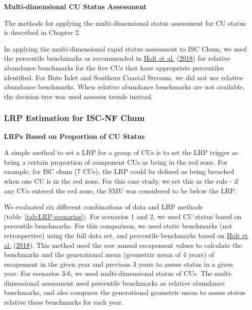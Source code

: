 \documentclass[11pt]{book}
\begin{document}
\textbf{Multi-dimensional CU Status Assessment}

The methods for applying the multi-dimensional status assessment for CU status is described in Chapter 2.

In applying the multi-dimensional rapid status assessment to ISC Chum, we used the percentile benchmarks as recommended in \protect\hyperlink{ref-holtEvaluatingBenchmarksBiological2018}{Holt et al.} (\protect\hyperlink{ref-holtEvaluatingBenchmarksBiological2018}{2018}) for relative abundance benchmarks for the five CUs that have appropriate percentiles identified. For Bute Inlet and Southern Coastal Streams, we did not use relative abundance benchmarks. When relative abundance benchmarks are not available, the decision tree was used assesses trends instead.

\hypertarget{lrp-estimation-for-isc-nf-chum}{%
\subsubsection{LRP Estimation for ISC-NF Chum}\label{lrp-estimation-for-isc-nf-chum}}

\textbf{LRPs Based on Proportion of CU Status}

A simple method to set a LRP for a group of CUs is to set the LRP trigger as being a certain proportion of component CUs as being in the red zone. For example, for ISC chum (7 CUs), the LRP could be defined as being breached when one CU is in the red zone. For this case study, we set this as the rule - if any CUs entered the red zone, the SMU was considered to be below the LRP.

We evaluated six different combinations of data and LRP methods (table~\ref{tab:LRP-scenarios}). For scenarios 1 and 2, we used CU status based on percentile benchmarks. For this comparison, we used static benchmarks (not retrospective) using the full data set, and percentile benchmarks based on \protect\hyperlink{ref-holtEvaluatingBenchmarksBiological2018}{Holt et al.} (\protect\hyperlink{ref-holtEvaluatingBenchmarksBiological2018}{2018}). This method used the raw annual escapement values to calculate the benchmarks and the generational mean (geometric mean of 4 years) of escapement in the given year and previous 3 years to assess status in a given year. For scenarios 3-6, we used multi-dimensional status of CUs. The multi-dimensional assessment used percentile benchmarks as relative abundance benchmarks, and also compares the generational geometric mean to assess status relative these benchmarks for each year.
\end{document}
